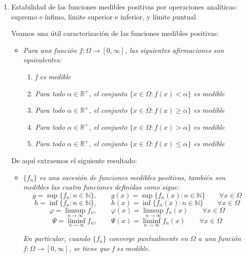 \documentclass[a4paper, 12pt]{article}
\begin{document}
\begin{enumerate}[label=\textbf{\arabic*}.]
\begin{enumerate}[label=\textit{\alph*)}]
	\medskip
	
	\item Estabilidad de las funciones medibles positivas por operaciones analíticas: supremo e ínfimo, límite superior e inferior, y límite puntual
	
	Veamos una útil caracterización de las funciones medibles positivas:
	
	\begin{itemize}
		\item \textit{Para una función \(f: \Omega \to [0, \infty]\), las siguientes afirmaciones son equivalentes:}
		\begin{enumerate}[label=(\textit{\roman*})]
			\item \textit{f es medible}
			\item \textit{Para todo \(\alpha \in \mathbb{R}^+\), el conjunto \(\{ x \in \Omega : f(x) < \alpha\}\) es medible}
			\item \textit{Para todo \(\alpha \in \mathbb{R}^+\), el conjunto \(\{ x \in \Omega : f(x) \geq  \alpha\}\) es medible}
			\item \textit{Para todo \(\alpha \in \mathbb{R}^+\), el conjunto \(\{ x \in \Omega : f(x) > \alpha\}\) es medible}
			\item \textit{Para todo \(\alpha \in \mathbb{R}^+\), el conjunto \(\{ x \in \Omega : f(x) \leq \alpha\}\) es medible}
		\end{enumerate}
	\end{itemize}
	
	\medskip
	
	De aquí extraemos el siguiente resultado:
	\begin{itemize}
		\item \textit{\(\{f_n\}\) es una sucesión de funciones medibles positivas, también son medibles las cuatro funciones definidas como sigue:}
		\[
			g = \sup \{f_n : n \in \mathbb{N}\}, \qquad g(x) = \sup \{f_n (x) : n \in \mathbb{N}\} \qquad \forall x \in \Omega
		\]
		\[
			h = \inf \{f_n : n \in \mathbb{N}\}, \qquad h(x) = \inf \{f_n (x) : n \in \mathbb{N}\} \qquad \forall x \in \Omega
		\]
		\[
			\varphi = \limsup_{n \to \infty} f_n, \qquad \varphi (x) = \limsup_{n \to \infty} f_n(x) \qquad \forall x \in \Omega
		\]
		\[
			\Psi = \liminf_{n \to \infty} f_n, \qquad \Psi (x) = \liminf_{n \to \infty} f_n(x) \qquad \forall x \in \Omega
		\]
		
		\textit{En particular, cuando \(\{f_n\}\) converge puntualmente en \(\Omega\) a una función \(f: \Omega \to [0, \infty]\), se tiene que f es medible.}
	\end{itemize}
\end{enumerate}


\end{enumerate}
\end{document}
